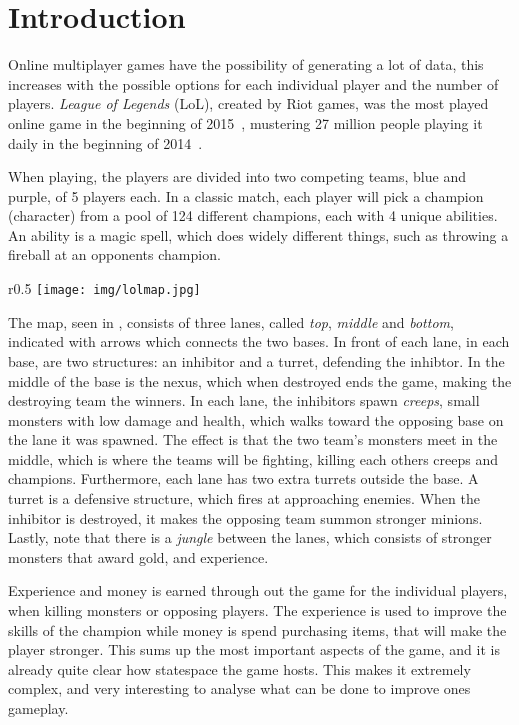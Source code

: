 \section{Introduction}\label{sec:intro}

Online multiplayer games have the possibility of generating a lot of data, this increases with the possible options for each individual player and the number of players. 
\emph{League of Legends} (LoL), created by Riot games, was the most played online game in the beginning of 2015~\cite{LoLmostplayed}, mustering 27 million people playing it daily in the beginning of 2014~\cite{LoL27mill}. 

When playing, the players are divided into two competing teams, blue and purple, of 5 players each. In a classic match, each player will pick a champion (character) from a pool of 124 different champions, each with 4 unique abilities. An ability is a magic spell, which does widely different things, such as throwing a fireball at an opponents champion.

\begin{wrapfigure}{r}{{0.5\textwidth}} %
  \centering
    \texttt{[image: img/lolmap.jpg]}
  \caption{League of legends map}\label{fig:lolmap}
\end{wrapfigure}

The map, seen in , consists of three lanes, called \emph{top}, \emph{middle} and \emph{bottom}, indicated with arrows which connects the two bases. In front of each lane, in each base, are two structures: an inhibitor and a turret, defending the inhibtor. In the middle of the base is the nexus, which when destroyed ends the game, making the destroying team the winners. In each lane, the inhibitors spawn \emph{creeps}, small monsters with low damage and health, which walks toward the opposing base on the lane it was spawned. The effect is that the two team's monsters meet in the middle, which is where the teams will be fighting, killing each others creeps and champions. Furthermore, each lane has two extra turrets outside the base. A turret is a defensive structure, which fires at approaching enemies. When the inhibitor is destroyed, it makes the opposing team summon stronger minions. Lastly, note that there is a \emph{jungle} between the lanes, which consists of stronger monsters that award gold, and experience.

Experience and money is earned through out the game for the individual players, when killing monsters or opposing players. The experience is used to improve the skills of the champion while money is spend purchasing items, that will make the player stronger. This sums up the most important aspects of the game, and it is already quite clear how statespace the game hosts. This makes it extremely complex, and very interesting to analyse what can be done to improve ones gameplay. 

